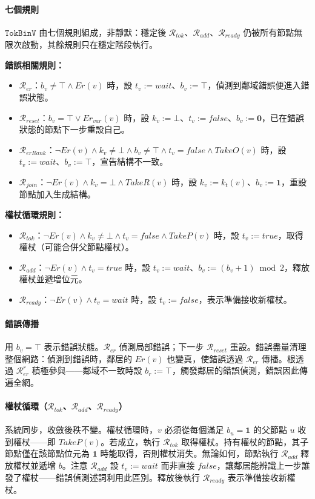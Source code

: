 \documentclass[a4paper, 12pt]{article}
\newcommand{\bz}{\mathbf{0}}
\newcommand{\bo}{\mathbf{1}}
\newcommand{\rk}{k}
\newcommand{\Rer}{\mathscr{R}_{er}}
\newcommand{\Rreset}{\mathscr{R}_{reset}}
\newcommand{\RerRank}{\mathscr{R}_{erRank}}
\newcommand{\Rjoin}{\mathscr{R}_{join}}
\newcommand{\Rtok}{\mathscr{R}_{tok}}
\newcommand{\Radd}{\mathscr{R}_{add}}
\newcommand{\Rready}{\mathscr{R}_{ready}}
\newcommand{\RerRoot}{\mathscr{R}^r_{er}}
\begin{document}
\paragraph{七個規則}
\(\mathtt{TokBinV}\) 由七個規則組成，非靜默：穩定後 \(\Rtok\)、\(\Radd\)、\(\Rready\) 仍被所有節點無限次啟動，其餘規則只在穩定階段執行。

\textbf{錯誤相關規則：}
\begin{itemize}
    \item \(\Rer\)：\(b_v\neq\top\wedge Er(v)\) 時，設 \(t_v:=\mathit{wait}\)、\(b_v:=\top\)，偵測到鄰域錯誤便進入錯誤狀態。
    \item \(\Rreset\)：\(b_v=\top\vee Er_{var}(v)\) 時，設 \(\rk_v:=\bot\)、\(t_v:=\mathit{false}\)、\(b_v:=\bz\)，已在錯誤狀態的節點下一步重設自己。
    \item \(\RerRank\)：\(\neg Er(v)\wedge \rk_v\neq\bot\wedge b_v\neq\top\wedge t_v=\mathit{false}\wedge \mathit{TakeO}(v)\) 時，設 \(t_v:=\mathit{wait}\)、\(b_v:=\top\)，宣告結構不一致。
    \item \(\Rjoin\)：\(\neg Er(v)\wedge \rk_v=\bot\wedge \mathit{TakeR}(v)\) 時，設 \(\rk_v:=\rk_t(v)\)、\(b_v:=\bo\)，重設節點加入生成結構。
\end{itemize}

\textbf{權杖循環規則：}
\begin{itemize}
    \item \(\Rtok\)：\(\neg Er(v)\wedge \rk_v\neq\bot\wedge t_v=\mathit{false}\wedge \mathit{TakeP}(v)\) 時，設 \(t_v:=\mathit{true}\)，取得權杖（可能合併父節點權杖）。
    \item \(\Radd\)：\(\neg Er(v)\wedge t_v=\mathit{true}\) 時，設 \(t_v:=\mathit{wait}\)、\(b_v:=(b_v+1)\bmod 2\)，釋放權杖並遞增位元。
    \item \(\Rready\)：\(\neg Er(v)\wedge t_v=\mathit{wait}\) 時，設 \(t_v:=\mathit{false}\)，表示準備接收新權杖。
\end{itemize}

\paragraph{錯誤傳播}
用 \(b_v=\top\) 表示錯誤狀態。\(\Rer\) 偵測局部錯誤；下一步 \(\Rreset\) 重設。錯誤盡量清理整個網路：偵測到錯誤時，鄰居的 \(Er(v)\) 也變真，使錯誤透過 \(\Rer\) 傳播。根透過 \(\RerRoot\) 積極參與——鄰域不一致時設 \(b_r:=\top\)，觸發鄰居的錯誤偵測，錯誤因此傳遍全網。

\paragraph{權杖循環（\(\Rtok\)、\(\Radd\)、\(\Rready\)）}
系統同步，收斂後秩不變。權杖循環時，\(v\) 必須從每個滿足 \(b_u=\bo\) 的父節點 \(u\) 收到權杖——即 \(\mathit{TakeP}(v)\)。若成立，執行 \(\Rtok\) 取得權杖。持有權杖的節點，其子節點僅在該節點位元為 \(\bo\) 時能取得，否則權杖消失。無論如何，節點執行 \(\Radd\) 釋放權杖並遞增 \(b\)。注意 \(\Radd\) 設 \(t_v:=\mathit{wait}\) 而非直接 \(\mathit{false}\)，讓鄰居能辨識上一步誰發了權杖——錯誤偵測述詞利用此區別。釋放後執行 \(\Rready\) 表示準備接收新權杖。
\end{document}
